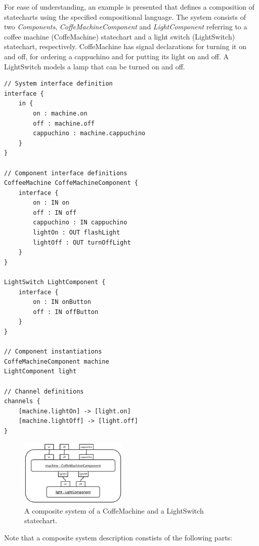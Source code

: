 \documentclass[conference]{IEEEtran}
\begin{document}
For ease of understanding, an example is presented that defines a composition of statecharts using the specified compositional language. The system consists of two \textsl{Components}, \emph{CoffeMachineComponent} and \emph{LightComponent} referring to a coffee machine (CoffeMachine) statechart and a light switch (LightSwitch) statechart, respectively. CoffeMachine has signal declarations for turning it on and off, for ordering a cappuchino and for putting its light on and off. A LightSwitch models a lamp that can be turned on and off.   
\begin{lstlisting}[basicstyle=\small]
// System interface definition
interface {
    in {
        on : machine.on
        off : machine.off
        cappuchino : machine.cappuchino
    }
}

// Component interface definitions
CoffeeMachine CoffeMachineComponent {
    interface {
        on : IN on
        off : IN off
        cappuchino : IN cappuchino
        lightOn : OUT flashLight
        lightOff : OUT turnOffLight 
    }
}

LightSwitch LightComponent {
    interface {
        on : IN onButton
        off : IN offButton
    }
}

// Component instantiations
CoffeMachineComponent machine
LightComponent light

// Channel definitions
channels {
    [machine.lightOn] -> [light.on]
    [machine.lightOff] -> [light.off]
} 	 
\end{lstlisting}

\begin{figure}[!t]
	\centering
	\includegraphics[width=0.455\textwidth]{figures/block_diagram_cropped2.pdf}%
	\caption{A composite system of a CoffeMachine and a LightSwitch statechart.}
	\label{fig:block_diagram_cropped2}
\end{figure}

Note that a composite system description constists of the following parts:
\end{document}
